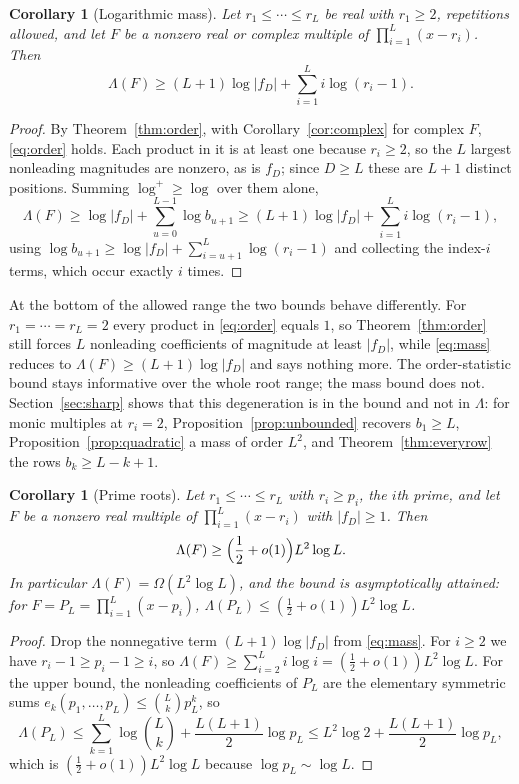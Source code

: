 \documentclass[11pt]{article}
\newtheorem{corollary}[theorem]{Corollary}
\begin{document}
\begin{corollary}[Logarithmic mass]\label{cor:mass}
Let $r_1\le\cdots\le r_L$ be real with $r_1\ge2$, repetitions allowed, and
let $F$ be a nonzero real or complex multiple of $\prod_{i=1}^L(x-r_i)$.  Then
\begin{equation}\label{eq:mass}
 \Lambda(F)\ge(L+1)\log|f_D|+\sum_{i=1}^{L}i\log(r_i-1).
\end{equation}
\end{corollary}

\begin{proof}
By Theorem~\ref{thm:order}, with Corollary~\ref{cor:complex} for complex
$F$, \eqref{eq:order} holds.  Each product in it is at least one because $r_i\ge2$, so the
$L$ largest nonleading magnitudes are nonzero, as is $f_D$; since $D\ge L$
these are $L+1$ distinct positions.  Summing $\log^+\ge\log$ over them alone,
\[
 \Lambda(F)\ge\log|f_D|+\sum_{u=0}^{L-1}\log b_{u+1}
 \ge(L+1)\log|f_D|+\sum_{i=1}^{L}i\log(r_i-1),
\]
using $\log b_{u+1}\ge\log|f_D|+\sum_{i=u+1}^L\log(r_i-1)$ and collecting the
index-$i$ terms, which occur exactly $i$ times.
\end{proof}

At the bottom of the allowed range the two bounds behave differently.  For
$r_1=\cdots=r_L=2$ every product in \eqref{eq:order} equals $1$, so
Theorem~\ref{thm:order} still forces $L$ nonleading coefficients of
magnitude at least $|f_D|$, while \eqref{eq:mass} reduces to
$\Lambda(F)\ge(L+1)\log|f_D|$ and says nothing more.  The order-statistic
bound stays informative over the whole root range; the mass bound does not.
Section~\ref{sec:sharp} shows that this degeneration is in the bound and not
in $\Lambda$: for monic multiples at $r_i=2$,
Proposition~\ref{prop:unbounded} recovers $b_1\ge L$,
Proposition~\ref{prop:quadratic} a mass of order $L^2$, and
Theorem~\ref{thm:everyrow} the rows $b_k\ge L-k+1$.

\begin{corollary}[Prime roots]\label{cor:prime}
Let $r_1\le\cdots\le r_L$ with $r_i\ge p_i$, the $i$th prime, and let $F$ be
a nonzero real multiple of $\prod_{i=1}^L(x-r_i)$ with $|f_D|\ge1$.  Then
\[
 \Lambda(F)\ge\Bigl(\frac12+o(1)\Bigr)L^2\log L .
\]
In particular $\Lambda(F)=\Omega(L^2\log L)$, and the bound is asymptotically
attained: for $F=P_L=\prod_{i=1}^L(x-p_i)$,
$\Lambda(P_L)\le(\tfrac12+o(1))L^2\log L$.
\end{corollary}

\begin{proof}
Drop the nonnegative term $(L+1)\log|f_D|$ from \eqref{eq:mass}.  For
$i\ge2$ we have $r_i-1\ge p_i-1\ge i$, so
$\Lambda(F)\ge\sum_{i=2}^Li\log i=(\frac12+o(1))L^2\log L$.  For the upper
bound, the nonleading coefficients of $P_L$ are the elementary symmetric
sums $e_k(p_1,\ldots,p_L)\le\binom{L}{k}p_L^k$, so
\[
 \Lambda(P_L)\le\sum_{k=1}^L\log\binom{L}{k}
 +\frac{L(L+1)}2\log p_L
 \le L^2\log2+\frac{L(L+1)}2\log p_L,
\]
which is $(\tfrac12+o(1))L^2\log L$ because $\log p_L\sim\log L$.
\end{proof}
\end{document}
